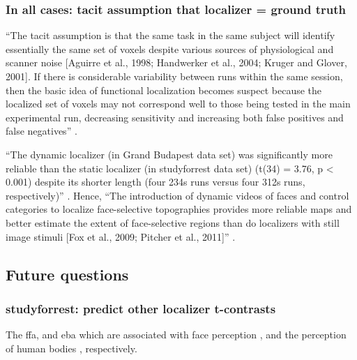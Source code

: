 \subsubsection{In all cases: tacit assumption that localizer = ground truth}


``The tacit assumption is that the same task in the same subject will identify
essentially the same set of voxels despite various sources of physiological and
scanner noise [Aguirre et al., 1998; Handwerker et al., 2004; Kruger and Glover,
2001].
%
If there is considerable variability between runs within the same session, then
the basic idea of functional localization becomes suspect because the localized
set of voxels may not correspond well to those being tested in the main
experimental run, decreasing sensitivity and increasing both false positives and
false negatives'' \citep{duncan2009consistency}.


``The dynamic localizer (in Grand Budapest data set) was significantly more
reliable than the static localizer (in studyforrest data set) (t(34) = 3.76, p <
0.001) despite its shorter length (four 234s runs versus four 312s runs,
respectively)'' \citep{jiahui2020predicting}.
%
Hence, ``The introduction of dynamic videos of faces and control categories to
localize face-selective topographies provides more reliable maps and better
estimate the extent of face-selective regions than do localizers with still
image stimuli [Fox et al., 2009; Pitcher et al., 2011]''
\citep{jiahui2020predicting}.


\subsection{Future questions}

\subsubsection{studyforrest: predict other localizer t-contrasts}


%
The \ac{ffa}, and \ac{eba}  which are associated with face perception
\citep{kanwisher1997ffa, pitcher2011occipitalfacearea}, and the perception of
human bodies \citep{downing2001bodyarea}, respectively.


